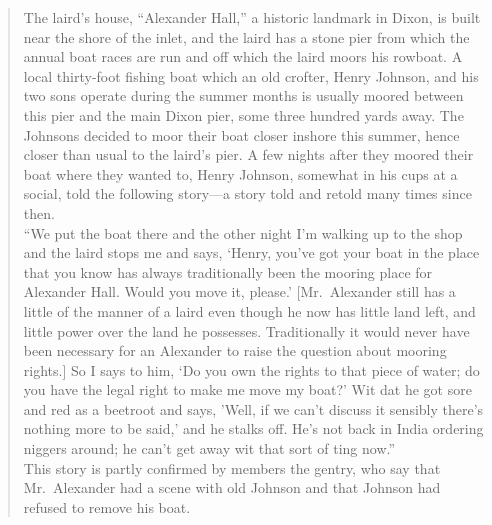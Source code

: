 \documentclass[openany,nobib]{tufte-book}
\begin{document}
\begin{quote}
The laird's house, ``Alexander Hall,'' a historic landmark in Dixon, is
built near the shore of the inlet, and the laird has a stone pier from
which the annual boat races are run and off which the laird moors his
rowboat. A local thirty-foot fishing boat which an old crofter, Henry
Johnson, and his two sons operate during the summer months is usually
moored between this pier and the main Dixon pier, some three hundred
yards away. The Johnsons decided to moor their boat closer inshore this
summer, hence closer than usual to the laird's pier. A few nights after
they moored their boat where they wanted to, Henry Johnson, somewhat in
his cups at a social, told the following story---a story told and retold
many times since then.\\
``We put the boat there and the other night I'm walking up to the shop
and the laird stops me and says, `Henry, you've got your boat in the
place that you know has always traditionally been the mooring place for
Alexander Hall. Would you move it, please.' {[}Mr.~Alexander still has a
little of the manner of a laird even though he now has little land left,
and little power over the land he possesses. Traditionally it would
never have been necessary for an Alexander to raise the question about
mooring rights.{]} So I says to him, `Do you own the rights to that
piece of water; do you have the legal right to make me move my boat?'
Wit dat he got sore and red as a beetroot and says, 'Well, if we can't
discuss it sensibly there's nothing more to be said,' and he stalks off.
He's not back in India ordering niggers around; he can't get away wit
that sort of ting now.''\\
This story is partly confirmed by members the gentry, who say that
Mr.~Alexander had a scene with old Johnson and that Johnson had refused
to remove his boat.
\end{quote}
\end{document}
